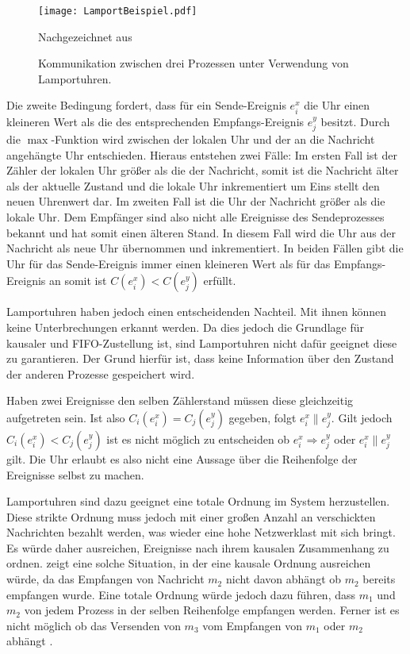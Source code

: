 \begin{figure}[ht]
    \centering
    \texttt{[image: LamportBeispiel.pdf]}
    \caption[Exemplarische Kommunikation mit Lamport Uhr]{Kommunikation zwischen drei Prozessen unter Verwendung von Lamportuhren.}
    Nachgezeichnet aus  \cite{landes2006dynamic}
    \label{fig:lamportBsp}
\end{figure}

Die zweite Bedingung fordert, dass für ein Sende-Ereignis $e_i^x$ die Uhr einen kleineren Wert als die des entsprechenden Empfangs-Ereignis $e_j^y$ besitzt.
Durch die $\max$-Funktion wird zwischen der lokalen Uhr und der an die Nachricht angehängte Uhr entschieden.
Hieraus entstehen zwei Fälle:
Im ersten Fall ist der Zähler der lokalen Uhr größer als die der Nachricht, somit ist die Nachricht älter als der aktuelle Zustand und die lokale Uhr inkrementiert um Eins stellt den neuen Uhrenwert dar.
Im zweiten Fall ist die Uhr der Nachricht größer als die lokale Uhr.
Dem Empfänger sind also nicht alle Ereignisse des Sendeprozesses bekannt und hat somit einen älteren Stand.
In diesem Fall wird die Uhr aus der Nachricht als neue Uhr übernommen und inkrementiert.
In beiden Fällen gibt die Uhr für das Sende-Ereignis immer einen kleineren Wert als für das Empfangs-Ereignis an somit ist $C(e_i^x) < C(e_j^y)$ erfüllt.

Lamportuhren haben jedoch einen entscheidenden Nachteil.
Mit ihnen können keine Unterbrechungen erkannt werden.
Da dies jedoch die Grundlage für kausaler und FIFO-Zustellung ist, sind Lamportuhren nicht dafür geeignet diese zu garantieren.
Der Grund hierfür ist, dass keine Information über den Zustand der anderen Prozesse gespeichert wird.

Haben zwei Ereignisse den selben Zählerstand müssen diese gleichzeitig aufgetreten sein.
Ist also $C_i(e_i^x)=C_j(e_j^y)$ gegeben, folgt $e_i^x \parallel e_j^y$.
Gilt jedoch $C_i(e_i^x)<C_j(e_j^y)$ ist es nicht möglich zu entscheiden ob $e_i^x \Rightarrow e_j^y$ oder $e_i^x \parallel e_j^y$ gilt.
Die Uhr erlaubt es also nicht eine Aussage über die Reihenfolge der Ereignisse selbst zu machen.

Lamportuhren sind dazu geeignet eine totale Ordnung im System herzustellen.
Diese strikte Ordnung muss jedoch mit einer großen Anzahl an verschickten Nachrichten bezahlt werden, was wieder eine hohe Netzwerklast mit sich bringt.
Es würde daher ausreichen, Ereignisse nach ihrem kausalen Zusammenhang zu ordnen.
 zeigt eine solche Situation, in der eine kausale Ordnung ausreichen würde, da das Empfangen von Nachricht $m_2$ nicht davon abhängt ob $m_2$ bereits empfangen wurde.
Eine totale Ordnung würde jedoch dazu führen, dass $m_1$ und $m_2$ von jedem Prozess in der selben Reihenfolge empfangen werden.
Ferner ist es nicht möglich ob das Versenden von $m_3$ vom Empfangen von $m_1$ oder $m_2$ abhängt \cite{tanenbaum2007distributed}.

